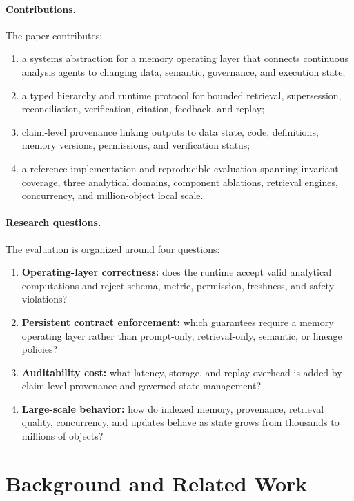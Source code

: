 \documentclass[10pt]{article}
\begin{document}
\paragraph{Contributions.} The paper contributes:
\begin{enumerate}
    \item a systems abstraction for a memory operating layer that connects continuous analysis agents to changing data, semantic, governance, and execution state;
    \item a typed hierarchy and runtime protocol for bounded retrieval, supersession, reconciliation, verification, citation, feedback, and replay;
    \item claim-level provenance linking outputs to data state, code, definitions, memory versions, permissions, and verification status;
    \item a reference implementation and reproducible evaluation spanning invariant coverage, three analytical domains, component ablations, retrieval engines, concurrency, and million-object local scale.
\end{enumerate}

\paragraph{Research questions.} The evaluation is organized around four questions:
\begin{enumerate}
    \item[RQ1.] \textbf{Operating-layer correctness:} does the runtime accept valid analytical computations and reject schema, metric, permission, freshness, and safety violations?
    \item[RQ2.] \textbf{Persistent contract enforcement:} which guarantees require a memory operating layer rather than prompt-only, retrieval-only, semantic, or lineage policies?
    \item[RQ3.] \textbf{Auditability cost:} what latency, storage, and replay overhead is added by claim-level provenance and governed state management?
    \item[RQ4.] \textbf{Large-scale behavior:} how do indexed memory, provenance, retrieval quality, concurrency, and updates behave as state grows from thousands to millions of objects?
\end{enumerate}

\section{Background and Related Work}
\end{document}
